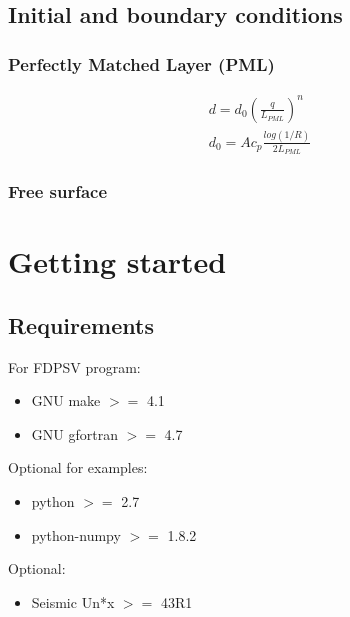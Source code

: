 \documentclass{gnulike}
\begin{document}
\section{Initial and boundary conditions}

\subsection{Perfectly Matched Layer (PML)}

\cite{berenger1994perfectly}

\begin{eqnarray}
\label{pml-damp}
d = d_{0} \left( \frac{q}{L_{PML}} \right) ^{n} \\
d_{0} = Ac_{p} \frac{log(1/R)}{2L_{PML}}
\end{eqnarray}

\subsection{Free surface}

\chapter{Getting started}

\section{Requirements}

\noindent For FDPSV program:
\begin{itemize}
	\item GNU make $>=$ 4.1
	\item GNU gfortran $>=$ 4.7
\end{itemize}

\noindent Optional for examples:
\begin{itemize}
	\item python $>=$ 2.7
	\item python-numpy $>=$ 1.8.2
\end{itemize}

\noindent Optional:
\begin{itemize}
	\item Seismic Un*x $>=$ 43R1
\end{itemize}
\end{document}
